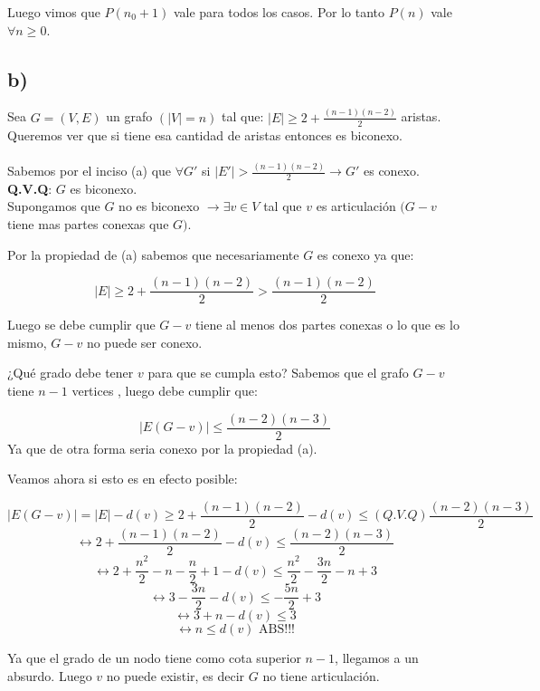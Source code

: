 \documentclass{article}
\begin{document}
Luego vimos que $P(n_0 +1)$ vale para todos los casos. 
Por lo tanto $P(n)$ vale $\forall n \geq 0$.

\newpage



\subsection{b)}

Sea $G = (V,E)$ un grafo $(|V| = n)$ tal que: $|E| \geq 2 + \frac{(n-1)(n-2)}{2}$ aristas. Queremos ver que si tiene esa cantidad de aristas entonces es biconexo.\\ \\
Sabemos por el inciso (a) que $\forall G'$ si $|E'| > \frac{(n-1)(n-2)}{2}  \rightarrow G'$ es conexo.\\

\textbf{Q.V.Q}: $G$ es biconexo.\\

Supongamos que $G$ no es biconexo $\rightarrow \exists v \in V$ tal que $v$ es articulación  $(G-v$ tiene mas partes conexas que $G)$.

Por la propiedad de (a) sabemos que necesariamente $G$ es conexo ya que:

\[ |E| \geq 2 + \frac{(n-1)(n-2)}{2} > \frac{(n-1)(n-2)}{2} \]

Luego se debe cumplir que $G - v$ tiene al menos dos partes conexas o lo que es lo mismo, $G-v$ no puede ser conexo.

¿Qué grado debe tener $v$ para que se cumpla esto? Sabemos que el grafo $G-v$ tiene $n - 1$ vertices , luego debe cumplir que:

\[ |E(G-v)| \leq \frac{(n-2)(n-3)}{2} \]
Ya que de otra forma seria conexo por la propiedad (a).

Veamos ahora si esto es en efecto posible:

\[ |E(G-v)| = |E| - d(v) \geq 2 + \frac{(n-1)(n-2)}{2} - d(v)  \leq (Q.V.Q) \frac{(n-2)(n-3)}{2} \]
\[ \leftrightarrow 2 + \frac{(n-1)(n-2)}{2} - d(v)  \leq \frac{(n-2)(n-3)}{2}  \]
\[ \leftrightarrow 2 + \frac{n^2}{2} - n - \frac{n}{2} + 1 -d(v) \leq \frac{n^2}{2} - \frac{3n}{2} - n + 3 \]
\[ \leftrightarrow 3 - \frac{3n}{2}  - d(v) \leq -\frac{5n}{2} + 3 \]
\[ \leftrightarrow 3 + n - d(v) \leq 3 \]
\[ \leftrightarrow n \leq d(v) \text{ ABS!!!} \]

Ya que el grado de un nodo tiene como cota superior $n-1$, llegamos a un absurdo. Luego $v$ no puede existir, es decir $G$ no tiene articulación.
\end{document}
